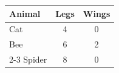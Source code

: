 \documentclass{article}
\begin{document}
\begin{tabular}{lcc}
\toprule
Animal & Legs & Wings \\
\midrule
Cat & 4 & 0 \\
Bee & 6 & 2 \\
\cmidrule{2-3}
Spider & 8 & 0 \\
\bottomrule
\end{tabular}
\end{document}
